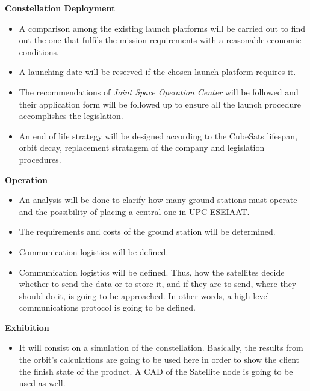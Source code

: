 {\bfseries Constellation Deployment} 

\begin{itemize}
	\item A comparison among the existing launch platforms will be carried out to find out the
one that fulfils the mission requirements with a reasonable economic conditions.
	\item A launching date will be reserved if the chosen launch platform requires it.
	\item The recommendations of \textit{Joint Space Operation Center} will be followed and their application form will be followed up to ensure all the launch procedure accomplishes the legislation.
 	\item An end of life strategy will be designed according to the CubeSats lifespan, orbit decay,
replacement stratagem of the company and legislation procedures.
\end{itemize}

{\bfseries Operation} 

\begin{itemize}
	\item An analysis will be done to clarify how many ground stations must operate and the possibility of placing a central one in UPC ESEIAAT.
	\item The requirements and costs of the ground station will be determined. 
	\item Communication logistics will be defined.
	\item Communication logistics will be defined. Thus, how the satellites decide whether to send the data or to store it, and if they are to send, where they should do it, is going to be approached. In other words, a high level communications protocol is going to be defined. 
\end{itemize}

{\bfseries Exhibition}

\begin{itemize}
	\item It will consist on a simulation of the constellation. Basically, the results from the orbit’s calculations are going to be used here in order to show the client the finish state of the product. A CAD of the Satellite node is going to be used as well.

\end{itemize}